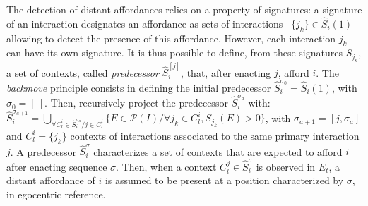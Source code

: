 \documentclass[conference]{IEEEtran}
\begin{document}

The detection of distant affordances relies on a property of signatures: a signature of an interaction designates an affordance as sets of interactions ~$\{j_k\} \in \hat{S}_i(1)$ allowing to detect the presence of this affordance.
However, each interaction $j_k$ can have its own signature. It is thus possible to define, from these signatures $S_{j_k}$, a set of contexts, called \textit{predecessor} $\hat{S}_i^{[j]}$, that, after enacting $j$, afford $i$. The \textit{backmove} principle consists in defining the initial predecessor $\hat{S}_i^{\sigma_0}=\hat{S}_i(1)$, with $\sigma_0=[~]$. Then, recursively project the predecessor $\hat{S}_i^{\sigma_a}$ with:
$\hat{S}_i^{\sigma_{a+1}}\!=\!\bigcup_{\forall C_l^i \in \hat{S}_i^{\sigma_a} / j \in C_l^i} \{E \in \mathcal{P}(I) / \forall j_k \in C_l^i, S_{j_k}(E)\!>\!0\}$,
with $\sigma_{a+1}=[j,\sigma_a]$ and $C_l^i=\{j_k\}$ contexts of interactions associated to the same primary interaction $j$. %
A predecessor $\hat{S}_i^\sigma$ characterizes a set of contexts that are expected to afford $i$ after enacting sequence $\sigma$. %
Then, when a context $C_l^j \in \hat{S}_i^\sigma$ is observed in $E_t$, a distant affordance of $i$ is assumed to be present at a position characterized by $\sigma$, in egocentric reference.


\end{document}
